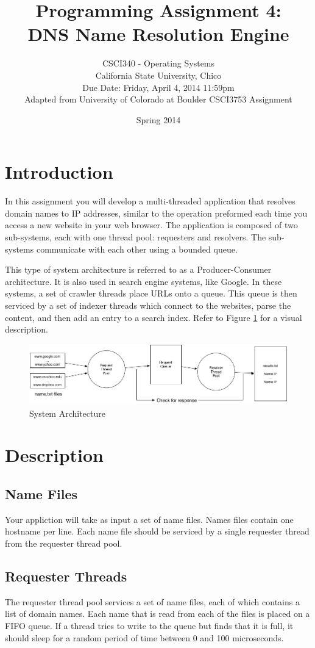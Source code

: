 \documentclass[12pt]{article}
\title{Programming Assignment 4:\\DNS Name Resolution Engine}
\author{
  CSCI340 - Operating Systems\\
  California State University, Chico\\
  Due Date:  Friday, April 4, 2014 11:59pm\\
  Adapted from University of Colorado at Boulder CSCI3753 Assignment\\
}
\date{Spring 2014}
\begin{document}
\maketitle

\section{Introduction}
In this assignment you will develop a multi-threaded
application that resolves domain names to IP addresses, similar to the
operation preformed each time you access a new website in your web browser.
The application is composed of two sub-systems, each with one thread pool:
requesters and resolvers. The sub-systems
communicate with each other using a bounded queue.

This type of system architecture is referred to as a Producer-Consumer
architecture. It is also used in search engine
systems, like Google. In these systems, a set of crawler threads place
URLs onto a queue. This queue is then serviced by a set of indexer
threads which connect to the websites, parse the content, and then add
an entry to a search index. Refer to Figure \ref{fig:sys} for a
visual description.

\begin{figure}[htbp]
  \begin{center}
    \includegraphics[width=150mm]{pa2_2.png}
    \caption{System Architecture}
    \label{fig:sys}
  \end{center}
\end{figure}

\section{Description}
\subsection{Name Files}
Your appliction will take as input a set of name files. Names files
contain one hostname per line. Each name file should be serviced by a
single requester thread from the requester thread pool.

\subsection{Requester Threads}
The requester thread pool
services a set of name files, each of which contains a list of domain
names. Each name that is
read from each of the files is placed on a FIFO queue.
If a thread tries to write to the
queue but finds that it is full, it should sleep for a random period
of time between 0 and 100 microseconds.
\end{document}
